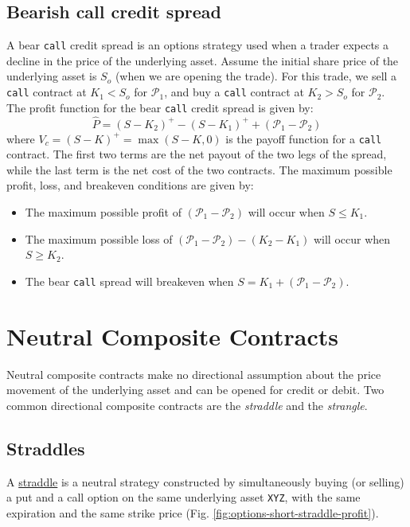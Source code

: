 \documentclass[11pt]{article}
\theoremstyle{definition}
\begin{document}
\subsection*{Bearish call credit spread}
A bear \texttt{call} credit spread is an options strategy used 
when a trader expects a decline in the price of the underlying asset. 
Assume the initial share price of the underlying asset is $S_{o}$ (when we are opening the trade).
For this trade, we sell a \texttt{call} contract at $K_{1}<S_{o}$ for $\mathcal{P}_{1}$, 
and buy a \texttt{call} contract at $K_{2}>S_{o}$ for $\mathcal{P}_{2}$. The profit function 
for the bear \texttt{call} credit spread is given by:
\begin{equation}
\hat{P} = (S-K_{2})^{+} - (S-K_{1})^{+} + (\mathcal{P}_{1}-\mathcal{P}_{2})
\end{equation}
where $V_{c} = (S-K)^{+}=\max(S-K,0)$ is the payoff function for a \texttt{call} contract. 
The first two terms are the net payout of the two legs of the spread, while the last term is the net cost of the two contracts. 
The maximum possible profit, loss, and breakeven conditions are given by:
\begin{itemize}
\item{The maximum possible profit of $\left(\mathcal{P}_{1} - \mathcal{P}_{2}\right)$ will occur when $S\leq{K_{1}}$.}
\item{The maximum possible loss of $\left(\mathcal{P}_{1} - \mathcal{P}_{2}\right) -(K_{2} - K_{1})$ will occur when $S\geq{K_{2}}$.}
\item{The bear \texttt{call} spread will breakeven when $S =  K_{1}+\left(\mathcal{P}_{1} - \mathcal{P}_{2}\right)$.}
\end{itemize}

\section*{Neutral Composite Contracts}
Neutral composite contracts make no directional assumption about the price movement of the underlying asset and can be opened for credit or debit.
Two common directional composite contracts are the \textit{straddle} and the \textit{strangle}.	

\subsection*{Straddles}
A \href{https://www.investopedia.com/terms/s/straddle.asp}{straddle} is a neutral strategy constructed by simultaneously buying (or selling) 
a put and a call option on the same underlying asset \texttt{XYZ}, with the same expiration and the same strike price (Fig. \ref{fig:options-short-straddle-profit}). 
\end{document}
